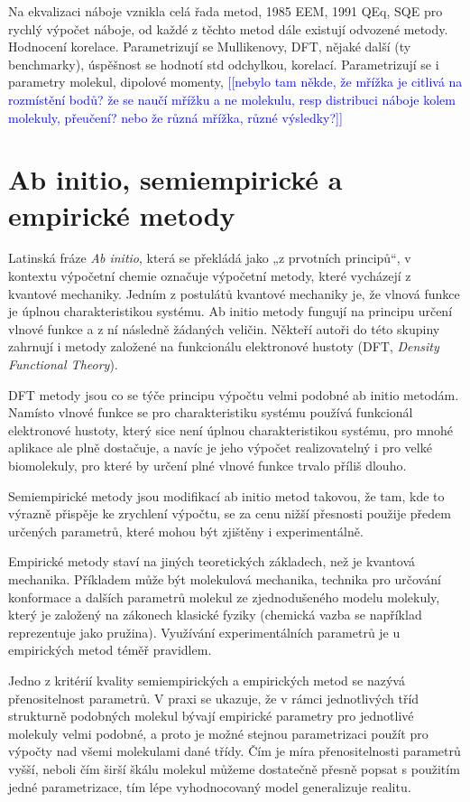 \documentclass[10pt,draft,oneside]{fithesis2}
\newcommand\todo[1]{\textcolor{blue}{[[#1]]}}
\begin{document}
Na ekvalizaci náboje vznikla celá řada metod, 1985 EEM, 1991 QEq, SQE pro rychlý výpočet náboje, od každé z těchto metod dále existují odvozené metody. Hodnocení korelace. Parametrizují se Mullikenovy, DFT, nějaké další (ty benchmarky), úspěšnost se hodnotí std odchylkou, korelací. Parametrizují se i parametry molekul, dipolové momenty, \todo{nebylo tam někde, že mřížka je citlivá na rozmístění bodů? že se naučí mřížku a ne molekulu, resp distribuci náboje kolem molekuly, přeučení? nebo že různá mřížka, různé výsledky?}

\section*{Ab initio, semiempirické a empirické metody}

Latinská fráze \emph{Ab initio}, která se překládá jako „z prvotních principů“, v kontextu výpočetní chemie označuje výpočetní metody, které vycházejí z kvantové mechaniky. Jedním z postulátů kvantové mechaniky je, že vlnová funkce je úplnou charakteristikou systému. Ab initio metody fungují na principu určení vlnové funkce a z ní následně žádaných veličin. Někteří autoři do této skupiny zahrnují i metody založené na funkcionálu elektronové hustoty (DFT,  \textit{\foreignlanguage{english}{Density Functional Theory}}).

DFT metody jsou co se týče principu výpočtu velmi podobné ab initio metodám. Namísto vlnové funkce se pro charakteristiku systému používá funkcionál elektronové hustoty, který sice není úplnou charakteristikou systému, pro mnohé aplikace ale plně dostačuje, a navíc je jeho výpočet realizovatelný i pro velké biomolekuly, pro které by určení plné vlnové funkce trvalo příliš dlouho.

Semiempirické metody jsou modifikací ab initio metod takovou, že tam, kde to výrazně přispěje ke zrychlení výpočtu, se za cenu nižší přesnosti použije předem určených parametrů, které mohou být zjištěny i experimentálně.

Empirické metody staví na jiných teoretických základech, než je kvantová mechanika. Příkladem může být molekulová mechanika, technika pro určování konformace a dalších parametrů molekul ze zjednodušeného modelu molekuly, který je založený na zákonech klasické fyziky (chemická vazba se například reprezentuje jako pružina). Využívání experimentálních parametrů je u empirických metod téměř pravidlem.

Jedno z kritérií kvality semiempirických a empirických metod se nazývá přenositelnost parametrů. V praxi se ukazuje, že v rámci jednotlivých tříd strukturně podobných molekul bývají empirické parametry pro jednotlivé molekuly velmi podobné, a proto je možné stejnou parametrizaci použít pro výpočty nad všemi molekulami dané třídy. Čím je míra přenositelnosti parametrů vyšší, neboli čím širší škálu molekul můžeme dostatečně přesně popsat s použitím jedné parametrizace, tím lépe vyhodnocovaný model generalizuje realitu.
\end{document}
